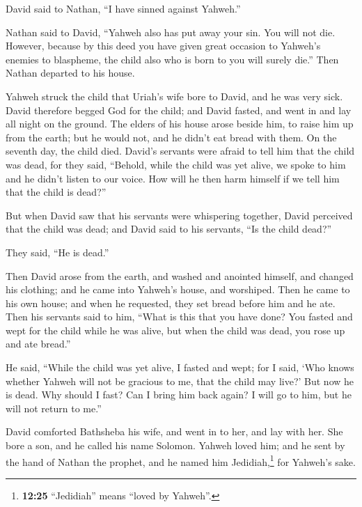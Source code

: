  David said to Nathan, ``I have sinned against Yahweh.''

Nathan said to David, ``Yahweh also has put away your sin. You will not
die.  However, because by this deed you have given great
occasion to Yahweh's enemies to blaspheme, the child also who is born to
you will surely die.''  Then Nathan departed to his
house.

Yahweh struck the child that Uriah's wife bore to David, and he was very
sick.  David therefore begged God for the child; and
David fasted, and went in and lay all night on the ground.
 The elders of his house arose beside him, to raise him
up from the earth; but he would not, and he didn't eat bread with them.
 On the seventh day, the child died. David's servants
were afraid to tell him that the child was dead, for they said,
``Behold, while the child was yet alive, we spoke to him and he didn't
listen to our voice. How will he then harm himself if we tell him that
the child is dead?''

 But when David saw that his servants were whispering
together, David perceived that the child was dead; and David said to his
servants, ``Is the child dead?''

They said, ``He is dead.''

 Then David arose from the earth, and washed and anointed
himself, and changed his clothing; and he came into Yahweh's house, and
worshiped. Then he came to his own house; and when he requested, they
set bread before him and he ate.  Then his servants said
to him, ``What is this that you have done? You fasted and wept for the
child while he was alive, but when the child was dead, you rose up and
ate bread.''

 He said, ``While the child was yet alive, I fasted and
wept; for I said, `Who knows whether Yahweh will not be gracious to me,
that the child may live?'  But now he is dead. Why should
I fast? Can I bring him back again? I will go to him, but he will not
return to me.''

 David comforted Bathsheba his wife, and went in to her,
and lay with her. She bore a son, and he called his name Solomon. Yahweh
loved him;  and he sent by the hand of Nathan the
prophet, and he named him Jedidiah,\footnote{\textbf{12:25} ``Jedidiah''
  means ``loved by Yahweh''.} for Yahweh's sake.

